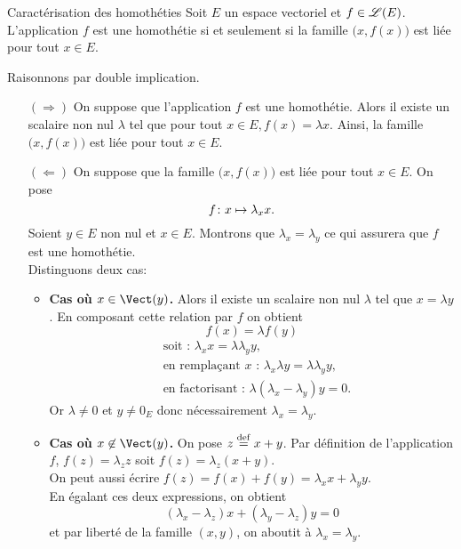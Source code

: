 \begin{prop}{Caractérisation des homothéties}
    Soit $E$ un espace vectoriel et $f \in \mathscr{L}(E)$. L'application $f$ est une homothétie si et seulement si la famille $\big(x, f(x) \big)$ est liée pour tout $x \in E$.
\end{prop}

\begin{marginfigure}
    \centering
    
\end{marginfigure}

\begin{preuve}
    Raisonnons par double implication. 
    \begin{itemize}
        \item[$(\Rightarrow)$] On suppose que l'application $f$ est une homothétie. Alors il existe un scalaire non nul $\lambda$ tel que pour tout $x \in E, f(x) = \lambda x$. Ainsi, la famille $\big(x, f(x) \big)$ est liée pour tout $x \in E$. 
        \item[$(\Leftarrow)$]  On suppose que la famille $\big(x, f(x) \big)$ est liée pour tout $x \in E$. On pose 
        $$f \colon x \mapsto \lambda_x x.$$
        Soient $y \in E$ non nul et $x \in E$. Montrons que $\lambda_x = \lambda_{y}$ ce qui assurera que $f$ est une homothétie. \\
        Distinguons deux cas:
        \begin{itemize}
            \item \textbf{Cas où $x \in \Vect(y)$.} Alors il existe un scalaire non nul $\lambda$ tel que $x = \lambda y$. En composant cette relation par $f$ on obtient
            $$f(x) = \lambda f(y)$$
            \begin{align*}
                &\text{soit : } \lambda_x x = \lambda \lambda_{y} y, \\
                &\text{en remplaçant $x$ : } \lambda_x \lambda y = \lambda \lambda_{y} y, \\
                &\text{en factorisant : } \lambda (\lambda_x - \lambda_{y}) y = 0.
            \end{align*}
            Or $\lambda \not= 0$ et $y \not= 0_E$ donc nécessairement $\lambda_x = \lambda_{y}$.
            \item \textbf{Cas où $x \not \in \Vect(y)$.} On pose $z \overset{\mathrm{\tiny def}}{=} x + y$. Par définition de l'application $f$, $f(z) = \lambda_z z$ soit $f(z) = \lambda_z(x + y)$. \\
            On peut aussi écrire $f(z) = f(x) + f(y) = \lambda_x x + \lambda_y y$. \\
            En égalant ces deux expressions, on obtient 
            $$(\lambda_x - \lambda_z) x + (\lambda_{y} - \lambda_z) y = 0$$
            et par liberté de la famille $(x, y)$, on aboutit à $\lambda_x = \lambda_{y}$.
        \end{itemize}
    \end{itemize}
\end{preuve}
